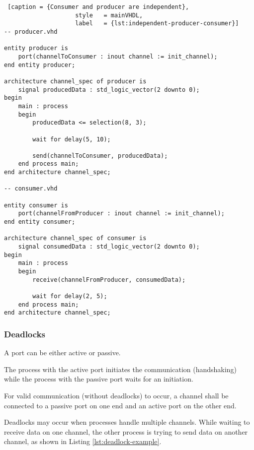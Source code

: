 \documentclass{report}
\begin{document}
\begin{lstlisting} [caption = {Consumer and producer are independent},
                    style   = mainVHDL,
                    label   = {lst:independent-producer-consumer}]
-- producer.vhd

entity producer is
    port(channelToConsumer : inout channel := init_channel);
end entity producer;

architecture channel_spec of producer is
    signal producedData : std_logic_vector(2 downto 0);
begin
    main : process
    begin
        producedData <= selection(8, 3);

        wait for delay(5, 10);

        send(channelToConsumer, producedData);
    end process main;
end architecture channel_spec;

-- consumer.vhd

entity consumer is
    port(channelFromProducer : inout channel := init_channel);
end entity consumer;

architecture channel_spec of consumer is
    signal consumedData : std_logic_vector(2 downto 0);
begin
    main : process
    begin
        receive(channelFromProducer, consumedData);

        wait for delay(2, 5);
    end process main;
end architecture channel_spec;
\end{lstlisting}


\subsubsection{Deadlocks}

A port can be either active or passive.

The process with the active port initiates the communication (handshaking) while
the process with the passive port waits for an initiation.

For valid communication (without deadlocks) to occur, a channel shall be
connected to a passive port on one end and an active port on the other end.

Deadlocks may occur when processes handle multiple channels. While waiting to
receive data on one channel, the other process is trying to send data on another
channel, as shown in Listing \ref{lst:deadlock-example}.
\end{document}
